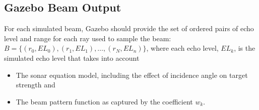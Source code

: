 \documentclass[11pt]{article}
\begin{document}
\subsection{Gazebo Beam Output}
For each simulated beam, Gazebo should provide the set of ordered pairs of echo level and range for each ray used to sample the beam: $B= \{(r_0,EL_0),(r_1,EL_1),\ldots,(r_N,EL_n)\}$, where each echo level, $EL_k$, is the simulated echo level that takes into account
\begin{itemize}
\item The sonar equation model, including the effect of incidence angle on target strength and
\item The beam pattern function as captured by the coefficient $w_k$.
\end{itemize}



\setcounter{page}{1}


\end{document}
